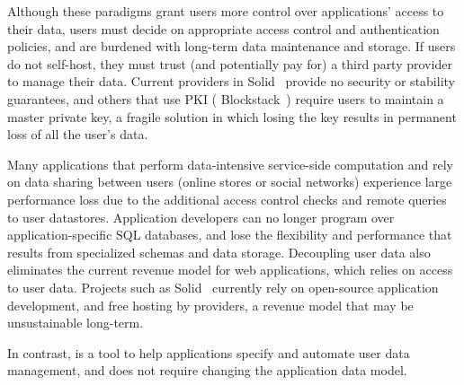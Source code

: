 Although these paradigms grant users more control over applications' access to their data, users
must decide on appropriate access control and authentication policies, and are burdened with
long-term data maintenance and storage. If users do not self-host, they must trust (and potentially
pay for) a third party provider to manage their data. Current providers in Solid~\cite{solid}
provide no security or stability guarantees, and others that use PKI (\eg
Blockstack~\cite{blockstack}) require users to maintain a master private key, a fragile solution in
which losing the key results in permanent loss of all the user's data.

Many applications that perform data-intensive service-side computation and rely on data sharing
between users (\eg online stores or social networks) experience large performance loss due to the
additional access control checks and remote queries to user datastores. Application
developers can no longer program over application-specific SQL databases, and lose the flexibility and performance that results from specialized schemas and data storage.
Decoupling user data also eliminates the current revenue model for web applications, which relies on access
to user data. Projects such as Solid~\cite{solid} currently rely on open-source application
development, and free hosting by providers, a revenue model that may be unsustainable
long-term.

In contrast, \sys is a tool to help applications specify and automate user data management, and
does not require changing the application data model.



